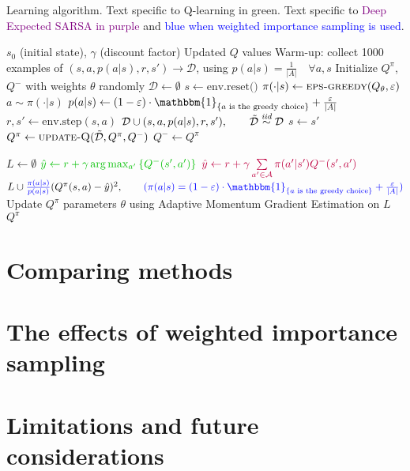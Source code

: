 \documentclass{article}
\begin{document}
\begin{algorithm}
    \caption{Learning algorithm. Text specific to \textcolor{dgreen}{Q-learning in green}. Text specific to \textcolor{purple}{Deep Expected SARSA in purple} and \textcolor{blue}{blue when weighted importance sampling is used}.}
    \begin{algorithmic}[1]
        \Require $s_0$ (initial state), $\gamma$ (discount factor)
        \Ensure Updated $Q$ values
        \State Warm-up: collect 1000 examples of $(s, a, p(a|s), r, s') \rightarrow \mathcal{D}$, using $p(a|s) = \frac{1}{|A|} \quad \forall a, s$
        \State Initialize $Q^\pi$, $Q^-$ with weights \(\theta\) randomly
        \State \(\mathcal{D} \gets \emptyset\)
        \Repeat
            \State $s \gets \text{env.reset()}$
            \Repeat
                \State $\pi(\cdot | s) \gets \Call{eps-greedy}{Q_\theta, \eps}$
                \State $a \sim \pi(\cdot|s)$
                \State $p(a|s) \gets (1 - \eps) \cdot \mathbbm{1}_{\set{a\text{ is the greedy choice}}} + \frac{\eps}{|A|}$
                \State $r, s' \gets \text{env.step}(s, a)$
                \State $\mathcal{D} \cup (s, a, p(a|s), r, s'),\qquad \tilde{\mathcal{D}} \overset{\textit{iid}}{\sim}\mathcal{D}$
                \State $s \gets s'$
                \State $Q^\pi \gets \Call{update-Q}{\tilde{\mathcal{D}}, Q^\pi, Q^-}$
                    \State $Q^- \gets Q^\pi$
                \EndIf
        
            \State $L \gets \emptyset$
                \State $\textcolor{dgreen}{\hat{y} \gets r + \gamma \arg\max_{a'}\set{Q^-(s',a')}}$
                \State $\textcolor{purple}{\hat{y} \gets r + \gamma \sum\limits_{a' \in \mathcal{A}} \pi(a' | s') Q^-(s', a')}$
                \State $L \cup \textcolor{blue}{\frac{\pi(a|s)}{p(a|s)}}(Q^\pi(s, a) - \hat{y})^2, \qquad \textcolor{blue}{(\pi(a|s) = (1 - \eps) \cdot \mathbbm{1}_{\set{a\text{ is the greedy choice}}} + \frac{\eps}{|A|})}$
                \EndFor
            \State Update $Q^\pi$ parameters \(\theta\) using Adaptive Momentum Gradient Estimation on \(L\)
            \State \Return $Q^\pi$
        \EndProcedure
    \end{algorithmic}
\end{algorithm}

\section{Comparing methods}
\section{The effects of weighted importance sampling}
\section{Limitations and future considerations}
\end{document}
